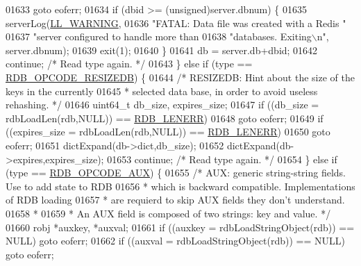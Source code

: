 \begin{DoxyCode}
{{{{{{{{{{{{{{{{{{{{{{{{{{{{01633                 \textcolor{keywordflow}{goto} eoferr;
01634             \textcolor{keywordflow}{if} (dbid >= (\textcolor{keywordtype}{unsigned})server.dbnum) \{
01635                 serverLog(\hyperlink{server_8h_a31229b9334bba7d6be2a72970967a14b}{LL\_WARNING},
01636                     \textcolor{stringliteral}{"FATAL: Data file was created with a Redis "}
01637                     \textcolor{stringliteral}{"server configured to handle more than %
01638                     \textcolor{stringliteral}{"databases. Exiting\(\backslash\)n"}, server.dbnum);
01639                 exit(1);
01640             \}
01641             db = server.db+dbid;
01642             \textcolor{keywordflow}{continue}; \textcolor{comment}{/* Read type again. */}
01643         \} \textcolor{keywordflow}{else} \textcolor{keywordflow}{if} (type == \hyperlink{rdb_8h_ad1f63cee59a3066446beecae389a8758}{RDB\_OPCODE\_RESIZEDB}) \{
01644             \textcolor{comment}{/* RESIZEDB: Hint about the size of the keys in the currently}
01645 \textcolor{comment}{             * selected data base, in order to avoid useless rehashing. */}
01646             uint64\_t db\_size, expires\_size;
01647             \textcolor{keywordflow}{if} ((db\_size = rdbLoadLen(rdb,NULL)) == \hyperlink{rdb_8h_aa66b6ad7261656029e6a67cf78432b2d}{RDB\_LENERR})
01648                 \textcolor{keywordflow}{goto} eoferr;
01649             \textcolor{keywordflow}{if} ((expires\_size = rdbLoadLen(rdb,NULL)) == \hyperlink{rdb_8h_aa66b6ad7261656029e6a67cf78432b2d}{RDB\_LENERR})
01650                 \textcolor{keywordflow}{goto} eoferr;
01651             dictExpand(db->dict,db\_size);
01652             dictExpand(db->expires,expires\_size);
01653             \textcolor{keywordflow}{continue}; \textcolor{comment}{/* Read type again. */}
01654         \} \textcolor{keywordflow}{else} \textcolor{keywordflow}{if} (type == \hyperlink{rdb_8h_ab0c62f54bb9377a6a75dbe331a2936bd}{RDB\_OPCODE\_AUX}) \{
01655             \textcolor{comment}{/* AUX: generic string-string fields. Use to add state to RDB}
01656 \textcolor{comment}{             * which is backward compatible. Implementations of RDB loading}
01657 \textcolor{comment}{             * are requierd to skip AUX fields they don't understand.}
01658 \textcolor{comment}{             *}
01659 \textcolor{comment}{             * An AUX field is composed of two strings: key and value. */}
01660             robj *auxkey, *auxval;
01661             \textcolor{keywordflow}{if} ((auxkey = rdbLoadStringObject(rdb)) == NULL) \textcolor{keywordflow}{goto} eoferr;
01662             \textcolor{keywordflow}{if} ((auxval = rdbLoadStringObject(rdb)) == NULL) \textcolor{keywordflow}{goto} eoferr;
}}}}}}}}}}}}}}}}}}}}}}}}}}}}}
\end{DoxyCode}
